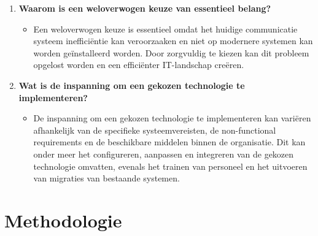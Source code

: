 \begin{enumerate}

\item \textbf{Waarom is een weloverwogen keuze van essentieel belang?}
  \begin{itemize}
      \item Een weloverwogen keuze is essentieel omdat het huidige communicatie systeem inefficiëntie kan veroorzaaken en niet op modernere systemen 
      kan worden geïnstalleerd worden. Door zorgvuldig te kiezen kan dit probleem opgelost worden en een 
      efficiënter IT-landschap creëren.
  \end{itemize}

\item \textbf{Wat is de inspanning om een gekozen technologie te implementeren?}
  \begin{itemize}
      \item De inspanning om een gekozen technologie te implementeren kan variëren afhankelijk van de specifieke systeemvereisten, 
      de non-functional requirements en de beschikbare middelen binnen de organisatie. Dit kan onder meer het configureren, 
      aanpassen en integreren van de gekozen technologie omvatten, evenals het trainen van personeel en het uitvoeren van migraties van 
      bestaande systemen.
  \end{itemize}
\end{enumerate}

\newpage

\section{Methodologie}%
\label{sec:methodologie}




